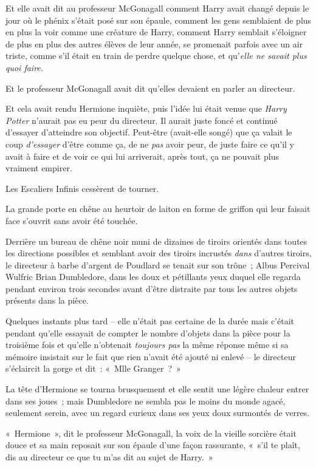 Et elle avait dit au professeur McGonagall comment Harry avait changé depuis le jour où le phénix s'était posé sur son épaule, comment les gens semblaient de plus en plus la voir comme une créature de Harry, comment Harry semblait s'éloigner de plus en plus des autres élèves de leur année, se promenait parfois avec un air triste, comme s'il était en train de perdre quelque chose, et qu'\emph{elle ne savait plus quoi faire.}

Et le professeur McGonagall avait dit qu'elles devaient en parler au directeur.

Et cela avait rendu Hermione inquiète, puis l'idée lui était venue que \emph{Harry Potter} n'aurait pas eu peur du directeur. Il aurait juste foncé et continué d'essayer d'atteindre son objectif. Peut-être (avait-elle songé) que ça valait le coup \emph{d'essayer} d'être comme ça, de ne \emph{pas} avoir peur, de juste faire ce qu'il y avait à faire et de voir ce qui lui arriverait, après tout, ça ne pouvait plus vraiment empirer.

Les Escaliers Infinis cessèrent de tourner.

La grande porte en chêne au heurtoir de laiton en forme de griffon qui leur faisait face s'ouvrit sans avoir été touchée.

Derrière un bureau de chêne noir muni de dizaines de tiroirs orientés dans toutes les directions possibles et semblant avoir des tiroirs incrustés \emph{dans} d'autres tiroirs, le directeur à barbe d'argent de Poudlard se tenait sur son trône~; Albus Percival Wulfric Brian Dumbledore, dans les doux et pétillants yeux duquel elle regarda pendant environ trois secondes avant d'être distraite par tous les autres objets présents dans la pièce.

Quelques instants plus tard -- elle n'était pas certaine de la durée mais c'était pendant qu'elle essayait de compter le nombre d'objets dans la pièce pour la troisième fois et qu'elle n'obtenait \emph{toujours pas} la même réponse même si sa mémoire insistait sur le fait que rien n'avait été ajouté ni enlevé -- le directeur s'éclaircit la gorge et dit~: «~Mlle Granger~?~»

La tête d'Hermione se tourna brusquement et elle sentit une légère chaleur entrer dans ses joues~; mais Dumbledore ne sembla pas le moins du monde agacé, seulement serein, avec un regard curieux dans ses yeux doux surmontés de verres.

«~Hermione~», dit le professeur McGonagall, la voix de la vieille sorcière était douce et sa main reposait sur son épaule d'une façon rassurante, «~s'il te plaît, dis au directeur ce que tu m'as dit au sujet de Harry.~»


